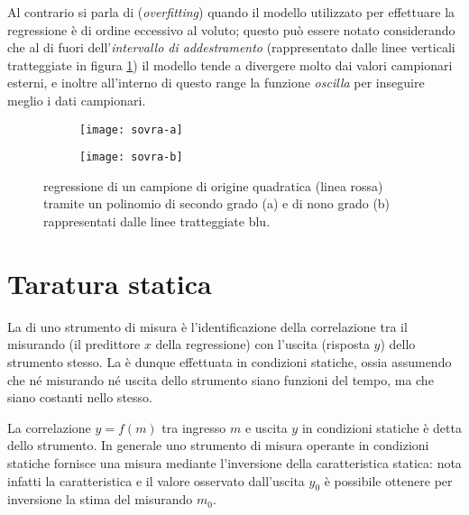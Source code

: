 		Al contrario si parla di  (\textit{overfitting}) quando il modello utilizzato per effettuare la regressione è di ordine eccessivo al voluto; questo può essere notato considerando che al di fuori dell'\textit{intervallo di addestramento} (rappresentato dalle linee verticali tratteggiate in figura \ref{fig:stat:sovraadattamento}) il modello tende a divergere molto dai valori campionari esterni, e inoltre all'interno di questo range la funzione \textit{oscilla} per inseguire meglio i dati campionari.
		
		\begin{figure}[bht]
			\centering
			\begin{subfigure}{0.49\linewidth}
				\centering
				\texttt{[image: sovra-a]} \caption{}
			\end{subfigure}
			\begin{subfigure}{0.49\linewidth}
				\centering
				\texttt{[image: sovra-b]} \caption{}
			\end{subfigure}
			\caption{regressione di un campione di origine quadratica (linea rossa) tramite un polinomio di secondo grado (a) e di nono grado (b) rappresentati dalle linee tratteggiate blu.}
			\label{fig:stat:sovraadattamento}
		\end{figure}
	
\section{Taratura statica}
	La  di uno strumento di misura è l'identificazione della correlazione tra il misurando (il predittore $x$ della regressione) con l'uscita (risposta $y$) dello strumento stesso. La  è dunque effettuata in condizioni statiche, ossia assumendo che né misurando né uscita dello strumento siano funzioni del tempo, ma che siano costanti nello stesso.
	
	La correlazione $y=f(m)$ tra ingresso $m$ e uscita $y$ in condizioni statiche è detta  dello strumento. In generale uno strumento di misura operante in condizioni statiche fornisce una misura mediante l'inversione della caratteristica statica: nota infatti la caratteristica e il valore osservato dall'uscita $y_0$ è possibile ottenere per inversione la stima del misurando $m_0$.	
	
	
